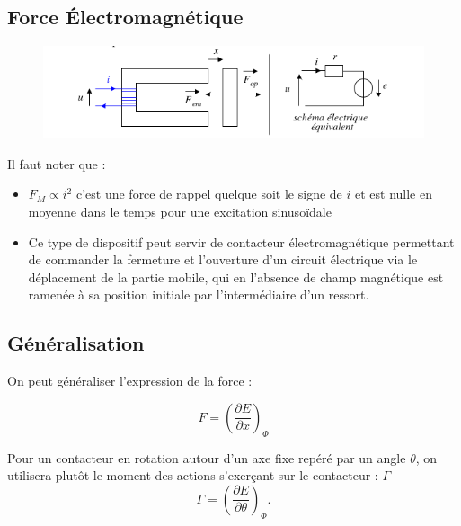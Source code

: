\documentclass[10pt]{beamer}
\begin{document}
\subsection{Force Électromagnétique}

\begin{frame}{\insertsubsection}
    \begin{figure}
        \centering
        \includegraphics[width=1\textwidth]{ForceElectromagnetique.png}
    \end{figure}
    \pause
    Il faut noter que : 
    \begin{itemize}
        \item $F_M\propto i ^2$ c'est une force de rappel quelque soit le signe de $i$  et est nulle en moyenne dans le temps pour une excitation sinusoïdale
        \item Ce type de dispositif peut servir de contacteur électromagnétique permettant de commander la fermeture et l'ouverture d'un circuit électrique via le déplacement de la partie mobile, qui en l'absence de champ magnétique est ramenée à sa position initiale par l'intermédiaire d'un ressort.
    \end{itemize}
\end{frame}

\subsection{Généralisation}

\begin{frame}{\insertsubsection}
    On peut généraliser l'expression de la force : 

    \begin{equation}
        F = \left(\dfrac{\partial E}{\partial x}\right)_{\Phi}
    \end{equation}

    Pour un contacteur en rotation autour d'un axe fixe repéré par un angle $\theta$, on utilisera plutôt le moment des actions s'exerçant sur le contacteur : $\Gamma$
    \begin{equation}
        \Gamma = \left(\dfrac{\partial E}{\partial \theta}\right)_{\Phi}.
    \end{equation}
\end{frame}
\end{document}
